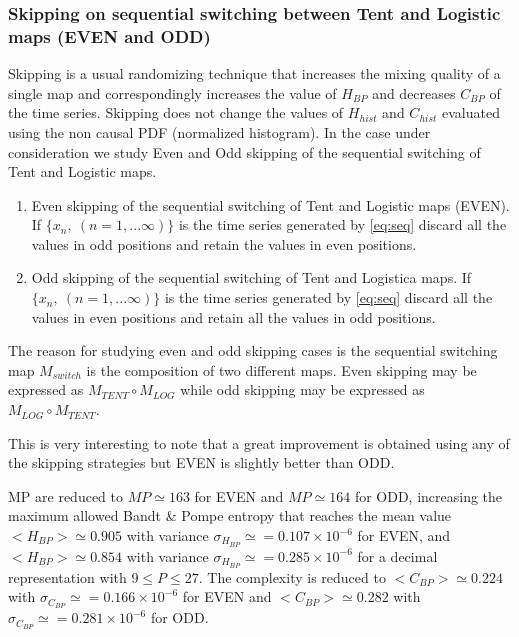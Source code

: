 \subsubsection{Skipping on sequential switching between Tent and Logistic maps (EVEN and ODD)} \label{sssec:switch}

Skipping is a usual randomizing technique that increases the mixing quality of a single map and correspondingly increases the value of $H_{BP}$ and decreases $C_{BP} $ of the time series. Skipping does not change the values of $H_{hist}$ and $C_{hist}$ evaluated using the non causal PDF (normalized histogram)\cite{DeMicco2008}. In the case under consideration we study Even and Odd skipping of the sequential switching of Tent and Logistic maps.

\begin{enumerate}
	\item Even skipping of the sequential switching of Tent and Logistic maps (EVEN).\\
	If $\{x_n,~(n=1,...\infty)\}$ is the time series generated by \ref{eq:seq} discard all the values in odd positions and retain the values in even positions.
	\item Odd skipping of the sequential switching of Tent and Logistica maps.
	If $\{x_n,~(n=1,...\infty)\}$ is the time series generated by \ref{eq:seq} discard all the values in even positions and retain all the values in odd positions.
\end{enumerate}

The reason for studying even and odd skipping cases is the sequential switching map $M_{switch}$ is the composition of two different maps. Even skipping may be expressed as $M_{TENT}\circ M_{LOG}$ while odd skipping may be expressed as $M_{LOG}\circ M_{TENT}$.

This is very interesting to note that a great improvement is obtained using any of the skipping strategies but EVEN is slightly better than ODD.  

MP are reduced to $MP\simeq 163$ for EVEN and $MP\simeq 164$ for ODD, increasing the maximum allowed Bandt \& Pompe entropy that reaches the mean value $<H_{BP}>\simeq 0.905$ with variance $\sigma_{H_{BP}}\simeq=0.107 \times 10^{-6}$ for EVEN, and $<H_{BP}>\simeq 0.854$ with variance $\sigma_{H_{BP}}\simeq=0.285 \times 10^{-6}$ for a decimal representation with  $9\leq P\leq27$. The complexity is reduced to $<C_{BP}>\simeq 0.224$ with $\sigma_{C_{BP}}\simeq=0.166 \times 10^{-6}$ for EVEN and  $<C_{BP}>\simeq 0.282$ with $\sigma_{C_{BP}}\simeq=0.281 \times 10^{-6}$ for ODD.

